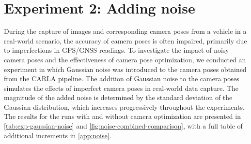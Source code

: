 \section{Experiment 2: Adding noise}

During the capture of images and corresponding camera poses from a vehicle in a real-world scenario, the accuracy of camera poses is often impaired, primarily due to imperfections in GPS/GNSS-readings. To investigate the impact of noisy camera poses and the effectiveness of camera pose optimization, we conducted an experiment in which Gaussian noise was introduced to the camera poses obtained from the CARLA pipeline. The addition of Gaussian noise to the camera poses simulates the effects of imperfect camera poses in real-world data capture. The magnitude of the added noise is determined by the standard deviation of the Gaussian distribution, which increases progressively throughout the experiments. The results for the runs with and without camera optimization are presented in \autoref{tab:exp-gaussian-noise} and \autoref{fig:noise-combined-comparison}, with a full table of additional increments in \autoref{app:noise}.

